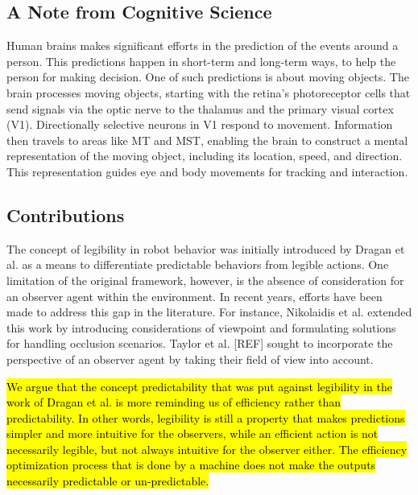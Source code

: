 \subsection{A Note from Cognitive Science}
Human brains makes significant efforts in the prediction of the events around a person. This predictions happen in short-term and long-term ways, to help the person for making decision. One of such predictions is about moving objects.
The brain processes moving objects, starting with the retina's photoreceptor cells that send signals via the optic nerve to the thalamus and the primary visual cortex (V1). Directionally selective neurons in V1 respond to movement. Information then travels to areas like MT and MST, enabling the brain to construct a mental representation of the moving object, including its location, speed, and direction. This representation guides eye and body movements for tracking and interaction.





\subsection{Contributions}
The concept of legibility in robot behavior was initially introduced by Dragan et al. \cite{dragan2013legibility} as a means to differentiate predictable behaviors from legible actions. One limitation of the original framework, however, is the absence of consideration for an observer agent within the environment. 
%
In recent years, efforts have been made to address this gap in the literature. For instance, Nikolaidis et al. \cite{nikolaidis2016based} extended this work by introducing considerations of viewpoint and formulating solutions for handling occlusion scenarios.
Taylor et al. [REF] sought to incorporate the perspective of an observer agent by taking their field of view into account. 

\hl{
    We argue that the concept predictability that was put against legibility in the work of Dragan et al. \cite{dragan2013legibility} is more reminding us of efficiency rather than predictability. In other words, legibility is still a property that makes predictions simpler and more intuitive for the observers, while an efficient action is not necessarily legible, but not always intuitive for the observer either. The efficiency optimization process that is done by a machine does not make the outputs necessarily predictable or un-predictable.
}

